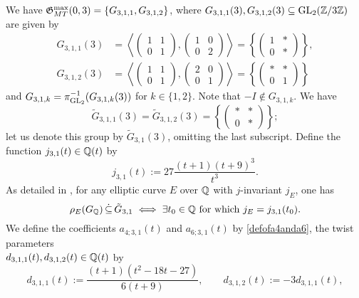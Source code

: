 We have $\mathfrak{G}_{MT}^{\max}(0,3) = \{ G_{3,1,1}, G_{3,1,2} \}$, where $G_{3,1,1}(3), G_{3,1,2}(3) \subseteq \operatorname{GL}_2(\mathbb{Z}/3\mathbb{Z})$ are given by
\[
\begin{split}
G_{3,1,1}(3) &= \left\langle \begin{pmatrix} 1 & 1 \\ 0 & 1 \end{pmatrix}, \begin{pmatrix} 1 & 0 \\ 0 & 2 \end{pmatrix} \right\rangle = \left\{ \begin{pmatrix} 1 & * \\ 0 & * \end{pmatrix} \right\}, \\
G_{3,1,2}(3) &= \left\langle \begin{pmatrix} 1 & 1 \\ 0 & 1 \end{pmatrix}, \begin{pmatrix} 2 & 0 \\ 0 & 1 \end{pmatrix} \right\rangle = \left\{ \begin{pmatrix} * & * \\ 0 & 1 \end{pmatrix} \right\}
\end{split}
\]
and $G_{3,1,k} = \pi_{\operatorname{GL}_2}^{-1}(G_{3,1,k}(3))$ for $k \in \{1,2 \}$. Note that $-I \notin G_{3,1,k}$. We have 
\[
\tilde{G}_{3,1,1}(3) = \tilde{G}_{3,1,2}(3) = \left\{ \begin{pmatrix} * & * \\ 0 & * \end{pmatrix} \right\};
\]
let us denote this group by $\tilde{G}_{3,1}(3)$, omitting the last subscript. Define the function $j_{3,1}(t) \in \mathbb{Q}(t)$ by
\[
j_{3,1}(t) := 27\frac{(t+1)(t+9)^3}{t^3}.
\]
As detailed in \cite{zywina}, for any elliptic curve $E$ over $\mathbb{Q}$ with $j$-invariant $j_E$, one has
\begin{equation} \label{level3jinvariantstatement}
\rho_{E}(G_{\mathbb{Q}}) \, \dot\subseteq \, \tilde{G}_{3,1} \; \Longleftrightarrow \; \exists t_0 \in \mathbb{Q} \text{ for which } j_E = j_{3,1}(t_0).
\end{equation}
We define the coefficients $a_{4;3,1}(t)$ and $a_{6;3,1}(t)$ by \eqref{defofa4anda6}, the twist parameters \\
$d_{3,1,1}(t), d_{3,1,2}(t) \in \mathbb{Q}(t)$ by
\[
d_{3,1,1}(t) := \frac{(t+1)(t^2 - 18t - 27)}{6(t+9)}, \quad\quad d_{3,1,2}(t) := -3 d_{3,1,1}(t),
\]
